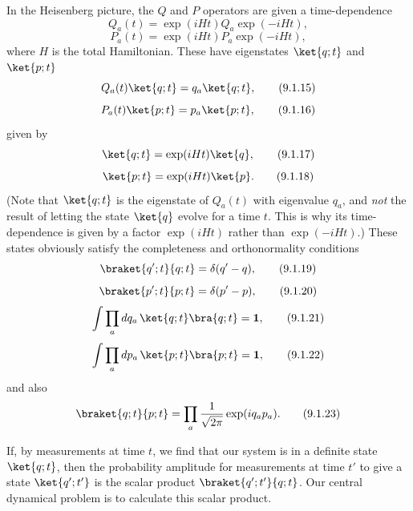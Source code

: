In the Heisenberg picture, the $Q$ and $P$ operators are given a
time-dependence
\begin{equation}
  Q_a(t)=\exp(iHt)Q_a\exp(-iHt),
  \tag{9.1.13}\label{eq:9.1.13}
\end{equation}
\begin{equation}
  P_a(t)=\exp(iHt)P_a\exp(-iHt),
  \tag{9.1.14}\label{eq:9.1.14}
\end{equation}
where $H$ is the total Hamiltonian. These have eigenstates $\ket{q;t}$ and
$\ket{p;t}$
\begin{equation}
  Q_a(t)\ket{q;t}=q_a\ket{q;t},
  \tag{9.1.15}\label{eq:9.1.15}
\end{equation}
\begin{equation}
  P_a(t)\ket{p;t}=p_a\ket{p;t},
  \tag{9.1.16}\label{eq:9.1.16}
\end{equation}
given by
\begin{equation}
  \ket{q;t}=\exp(iHt)\ket{q},
  \tag{9.1.17}\label{eq:9.1.17}
\end{equation}
\begin{equation}
  \ket{p;t}=\exp(iHt)\ket{p}.
  \tag{9.1.18}\label{eq:9.1.18}
\end{equation}
(Note that $\ket{q;t}$ is the eigenstate of $Q_a(t)$ with eigenvalue $q_a$,
and \emph{not} the result of letting the state $\ket{q}$ evolve for a time
$t$. This is why its time-dependence is given by a factor $\exp(iHt)$ rather
than $\exp(-iHt)$.) These states obviously satisfy the completeness and
orthonormality conditions
\begin{equation}
  \braket{q';t}{q;t}=\delta(q'-q),
  \tag{9.1.19}\label{eq:9.1.19}
\end{equation}
\begin{equation}
  \braket{p';t}{p;t}=\delta(p'-p),
  \tag{9.1.20}\label{eq:9.1.20}
\end{equation}
\begin{equation}
  \int\prod_a dq_a\,\ket{q;t}\bra{q;t}=\mathbf{1},
  \tag{9.1.21}\label{eq:9.1.21}
\end{equation}
\begin{equation}
  \int\prod_a dp_a\,\ket{p;t}\bra{p;t}=\mathbf{1},
  \tag{9.1.22}\label{eq:9.1.22}
\end{equation}
and also
\begin{equation}
  \braket{q;t}{p;t}=\prod_a\frac{1}{\sqrt{2\pi}}\exp(iq_ap_a).
  \tag{9.1.23}\label{eq:9.1.23}
\end{equation}

If, by measurements at time $t$, we find that our system is in a definite
state $\ket{q;t}$, then the probability amplitude for measurements at time
$t'$ to give a state $\ket{q';t'}$ is the scalar product
$\braket{q';t'}{q;t}$. Our central dynamical problem is to calculate this
scalar product.

